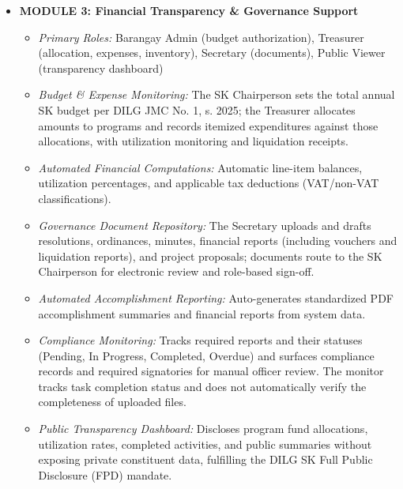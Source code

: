 \begin{itemize}
   \item \textbf{MODULE 3: Financial Transparency \& Governance Support}
    \begin{itemize}
        \item \textit{Primary Roles:} Barangay Admin (budget authorization), Treasurer (allocation, expenses, inventory), Secretary (documents), Public Viewer (transparency dashboard)
        \item \textit{Budget \& Expense Monitoring:} The SK Chairperson sets the total annual SK budget per DILG JMC No. 1, s. 2025; the Treasurer allocates amounts to programs and records itemized expenditures against those allocations, with utilization monitoring and liquidation receipts.
        \item \textit{Automated Financial Computations:} Automatic line-item balances, utilization percentages, and applicable tax deductions (VAT/non-VAT classifications).
        \item \textit{Governance Document Repository:} The Secretary uploads and drafts resolutions, ordinances, minutes, financial reports (including vouchers and liquidation reports), and project proposals; documents route to the SK Chairperson for electronic review and role-based sign-off.
        \item \textit{Automated Accomplishment Reporting:} Auto-generates standardized PDF accomplishment summaries and financial reports from system data.
        \item \textit{Compliance Monitoring:} Tracks required reports and their statuses (Pending, In Progress, Completed, Overdue) and surfaces compliance records and required signatories for manual officer review. The monitor tracks task completion status and does not automatically verify the completeness of uploaded files.
        \item \textit{Public Transparency Dashboard:} Discloses program fund allocations, utilization rates, completed activities, and public summaries without exposing private constituent data, fulfilling the DILG SK Full Public Disclosure (FPD) mandate.
    \end{itemize}


\end{itemize}
